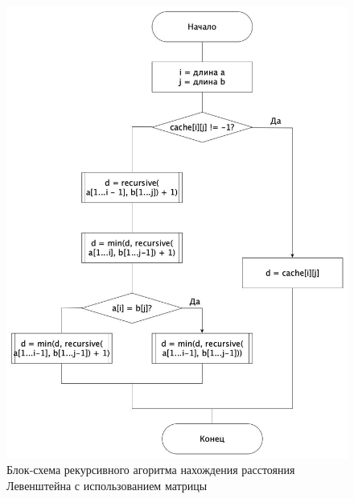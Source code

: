 \documentclass[12pt]{report}
\begin{document}
    \begin{figure}[H]
        \centering
        \includegraphics[width=0.7\linewidth]{img/levRecurCache}
        \caption{Блок-схема рекурсивного агоритма нахождения расстояния Левенштейна с использованием матрицы}
        \label{fig:levRecurCache}
    \end{figure}
\end{document}
